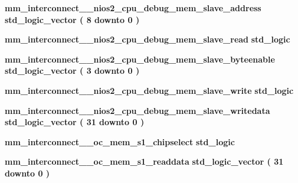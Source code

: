 \begin{DoxyCompactItemize}
\item 
{\bf mm\+\_\+interconnect\+\_\+\_\+nios2\+\_\+cpu\+\_\+debug\+\_\+mem\+\_\+slave\+\_\+address} {\bfseries \textcolor{comment}{std\+\_\+logic\+\_\+vector}\textcolor{vhdlchar}{ }\textcolor{vhdlchar}{(}\textcolor{vhdlchar}{ }\textcolor{vhdlchar}{ } \textcolor{vhdldigit}{8} \textcolor{vhdlchar}{ }\textcolor{keywordflow}{downto}\textcolor{vhdlchar}{ }\textcolor{vhdlchar}{ } \textcolor{vhdldigit}{0} \textcolor{vhdlchar}{ }\textcolor{vhdlchar}{)}\textcolor{vhdlchar}{ }} 
\item 
{\bf mm\+\_\+interconnect\+\_\+\_\+nios2\+\_\+cpu\+\_\+debug\+\_\+mem\+\_\+slave\+\_\+read} {\bfseries \textcolor{comment}{std\+\_\+logic}\textcolor{vhdlchar}{ }} 
\item 
{\bf mm\+\_\+interconnect\+\_\+\_\+nios2\+\_\+cpu\+\_\+debug\+\_\+mem\+\_\+slave\+\_\+byteenable} {\bfseries \textcolor{comment}{std\+\_\+logic\+\_\+vector}\textcolor{vhdlchar}{ }\textcolor{vhdlchar}{(}\textcolor{vhdlchar}{ }\textcolor{vhdlchar}{ } \textcolor{vhdldigit}{3} \textcolor{vhdlchar}{ }\textcolor{keywordflow}{downto}\textcolor{vhdlchar}{ }\textcolor{vhdlchar}{ } \textcolor{vhdldigit}{0} \textcolor{vhdlchar}{ }\textcolor{vhdlchar}{)}\textcolor{vhdlchar}{ }} 
\item 
{\bf mm\+\_\+interconnect\+\_\+\_\+nios2\+\_\+cpu\+\_\+debug\+\_\+mem\+\_\+slave\+\_\+write} {\bfseries \textcolor{comment}{std\+\_\+logic}\textcolor{vhdlchar}{ }} 
\item 
{\bf mm\+\_\+interconnect\+\_\+\_\+nios2\+\_\+cpu\+\_\+debug\+\_\+mem\+\_\+slave\+\_\+writedata} {\bfseries \textcolor{comment}{std\+\_\+logic\+\_\+vector}\textcolor{vhdlchar}{ }\textcolor{vhdlchar}{(}\textcolor{vhdlchar}{ }\textcolor{vhdlchar}{ } \textcolor{vhdldigit}{31} \textcolor{vhdlchar}{ }\textcolor{keywordflow}{downto}\textcolor{vhdlchar}{ }\textcolor{vhdlchar}{ } \textcolor{vhdldigit}{0} \textcolor{vhdlchar}{ }\textcolor{vhdlchar}{)}\textcolor{vhdlchar}{ }} 
\item 
{\bf mm\+\_\+interconnect\+\_\+\_\+oc\+\_\+mem\+\_\+s1\+\_\+chipselect} {\bfseries \textcolor{comment}{std\+\_\+logic}\textcolor{vhdlchar}{ }} 
\item 
{\bf mm\+\_\+interconnect\+\_\+\_\+oc\+\_\+mem\+\_\+s1\+\_\+readdata} {\bfseries \textcolor{comment}{std\+\_\+logic\+\_\+vector}\textcolor{vhdlchar}{ }\textcolor{vhdlchar}{(}\textcolor{vhdlchar}{ }\textcolor{vhdlchar}{ } \textcolor{vhdldigit}{31} \textcolor{vhdlchar}{ }\textcolor{keywordflow}{downto}\textcolor{vhdlchar}{ }\textcolor{vhdlchar}{ } \textcolor{vhdldigit}{0} \textcolor{vhdlchar}{ }\textcolor{vhdlchar}{)}\textcolor{vhdlchar}{ }} 

\end{DoxyCompactItemize}

